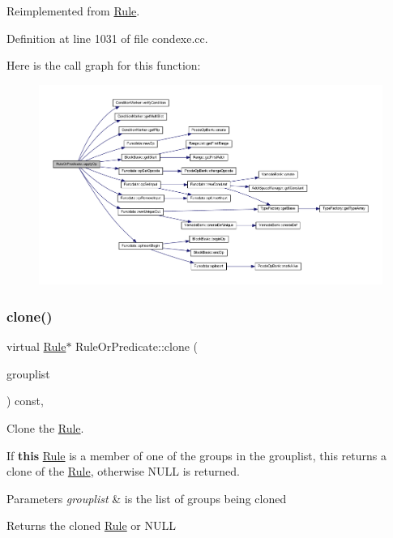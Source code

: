 Reimplemented from \mbox{\hyperlink{class_rule_a4e3e61f066670175009f60fb9dc60848}{Rule}}.



Definition at line 1031 of file condexe.\+cc.

Here is the call graph for this function\+:
\nopagebreak
\begin{figure}[H]
\begin{center}
\leavevmode
\includegraphics[width=350pt]{class_rule_or_predicate_ae9bd9f602cf43e10c02623d2ee5e6fc7_cgraph}
\end{center}
\end{figure}
\mbox{\label{class_rule_or_predicate_a190f266ab1a951a70b6413460c48f0fa}} 
\subsubsection{\texorpdfstring{clone()}{clone()}}
{\footnotesize\ttfamily virtual \mbox{\hyperlink{class_rule}{Rule}}$\ast$ Rule\+Or\+Predicate\+::clone (\begin{DoxyParamCaption}\item[{const \mbox{\hyperlink{class_action_group_list}{Action\+Group\+List}} \&}]{grouplist }\end{DoxyParamCaption}) const\hspace{0.3cm}{\ttfamily [inline]}, {\ttfamily [virtual]}}



Clone the \mbox{\hyperlink{class_rule}{Rule}}. 

If {\bfseries{this}} \mbox{\hyperlink{class_rule}{Rule}} is a member of one of the groups in the grouplist, this returns a clone of the \mbox{\hyperlink{class_rule}{Rule}}, otherwise N\+U\+LL is returned. 
\begin{DoxyParams}{Parameters}
{\em grouplist} & is the list of groups being cloned \\
\hline
\end{DoxyParams}
\begin{DoxyReturn}{Returns}
the cloned \mbox{\hyperlink{class_rule}{Rule}} or N\+U\+LL 
\end{DoxyReturn}


